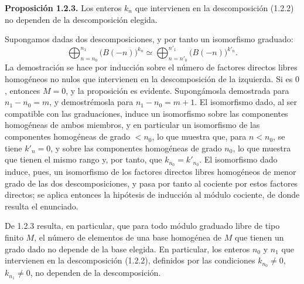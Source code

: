 \textbf{Proposición 1.2.3.} Los enteros \(k_n\) que intervienen en la descomposición (1.2.2) no dependen de la descomposición elegida.

Supongamos dadas dos descomposiciones, y por tanto un isomorfismo graduado:
\[
  \bigoplus_{n=n_0}^{n_1}\bigl(B(-n)\bigr)^{k_n}\simeq
  \bigoplus_{n=n'_0}^{n'_1}\bigl(B(-n)\bigr)^{k'_n}.
\]
La demostración se hace por inducción sobre el número de factores directos libres homogéneos no nulos que intervienen en la descomposición de la izquierda. Si es \(0\), entonces \(M=0\), y la proposición es evidente. Supongámosla demostrada para \(n_1-n_0=m\), y demostrémosla para \(n_1-n_0=m+1\). El isomorfismo dado, al ser compatible con las graduaciones, induce un isomorfismo sobre las componentes homogéneas de ambos miembros, y en particular un isomorfismo de las componentes homogéneas de grado \(<n_0\), lo que muestra que, para \(n<n_0\), se tiene \(k'_n=0\), y sobre las componentes homogéneas de grado \(n_0\), lo que muestra que tienen el mismo rango y, por tanto, que \(k_{n_0}=k'_{n_0}\). El isomorfismo dado induce, pues, un isomorfismo de los factores directos libres homogéneos de menor grado de las dos descomposiciones, y pasa por tanto al cociente por estos factores directos; se aplica entonces la hipótesis de inducción al módulo cociente, de donde resulta el enunciado.

De 1.2.3 resulta, en particular, que para todo módulo graduado libre de tipo finito \(M\), el número de elementos de una base homogénea de \(M\) que tienen un grado dado no depende de la base elegida. En particular, los enteros \(n_0\) y \(n_1\) que intervienen en la descomposición (1.2.2), definidos por las condiciones \(k_{n_0}\neq0\), \(k_{n_1}\neq0\), no dependen de la descomposición.

